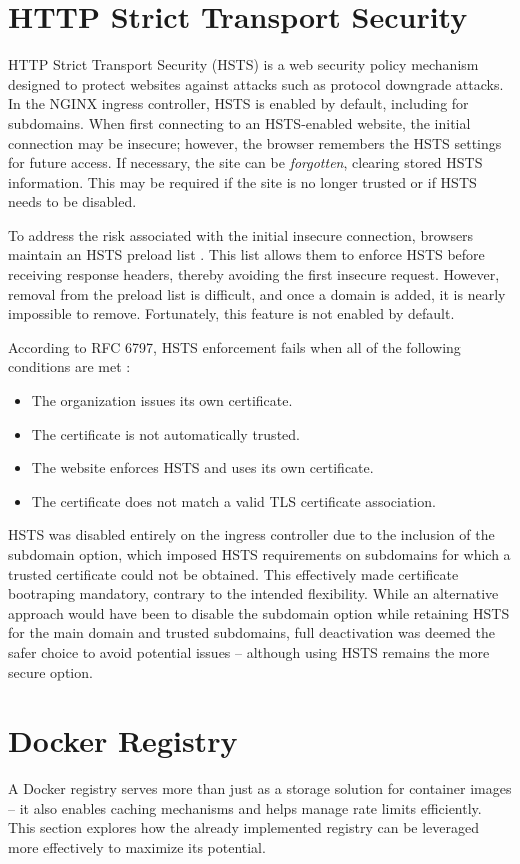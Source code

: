 \section{HTTP Strict Transport Security}
HTTP Strict Transport Security (HSTS) is a web security policy mechanism designed to protect websites against attacks such as protocol downgrade attacks. In the NGINX ingress controller, HSTS is enabled by default, including for subdomains. When first connecting to an HSTS-enabled website, the initial connection may be insecure; however, the browser remembers the HSTS settings for future access. If necessary, the site can be \textit{forgotten}, clearing stored HSTS information. This may be required if the site is no longer trusted or if HSTS needs to be disabled.

To address the risk associated with the initial insecure connection, browsers maintain an HSTS preload list \parencite{hstspreload}. This list allows them to enforce HSTS before receiving response headers, thereby avoiding the first insecure request. However, removal from the preload list is difficult, and once a domain is added, it is nearly impossible to remove. Fortunately, this feature is not enabled by default.

According to RFC 6797, HSTS enforcement fails when all of the following conditions are met \parencite{rfc6797}:

\begin{itemize}
    \item The organization issues its own certificate.
    \item The certificate is not automatically trusted.
    \item The website enforces HSTS and uses its own certificate.
    \item The certificate does not match a valid TLS certificate association.
\end{itemize}

HSTS was disabled entirely on the ingress controller due to the inclusion of the subdomain option, which imposed HSTS requirements on subdomains for which a trusted certificate could not be obtained. This effectively made certificate bootraping mandatory, contrary to the intended flexibility. While an alternative approach would have been to disable the subdomain option while retaining HSTS for the main domain and trusted subdomains, full deactivation was deemed the safer choice to avoid potential issues -- although using HSTS remains the more secure option.

\section{Docker Registry}
A Docker registry serves more than just as a storage solution for container images -- it also enables caching mechanisms and helps manage rate limits efficiently. This section explores how the already implemented registry can be leveraged more effectively to maximize its potential.


